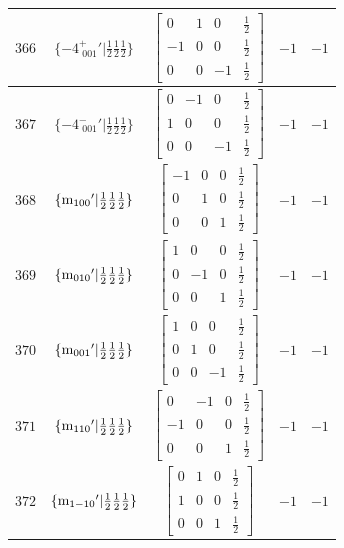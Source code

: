 \documentclass[fleqn,8pt]{jsarticle}
\begin{document}
\begin{longtable}{ccccc}
$ 366 $ & $ \{-4^{+}_{\,\,001}{}'|\frac{1}{2} \frac{1}{2} \frac{1}{2}\} $ & $ \begin{bmatrix} 0 & 1 & 0 & \frac{1}{2} \\ -1 & 0 & 0 & \frac{1}{2} \\ 0 & 0 & -1 & \frac{1}{2} \end{bmatrix} $ & $ -1 $ & $ -1 $ \\ \hline
$ 367 $ & $ \{-4^{-}_{\,\,001}{}'|\frac{1}{2} \frac{1}{2} \frac{1}{2}\} $ & $ \begin{bmatrix} 0 & -1 & 0 & \frac{1}{2} \\ 1 & 0 & 0 & \frac{1}{2} \\ 0 & 0 & -1 & \frac{1}{2} \end{bmatrix} $ & $ -1 $ & $ -1 $ \\ \hline
$ 368 $ & $ \{{\rm m}_{100}{}'|\frac{1}{2} \frac{1}{2} \frac{1}{2}\} $ & $ \begin{bmatrix} -1 & 0 & 0 & \frac{1}{2} \\ 0 & 1 & 0 & \frac{1}{2} \\ 0 & 0 & 1 & \frac{1}{2} \end{bmatrix} $ & $ -1 $ & $ -1 $ \\ \hline
$ 369 $ & $ \{{\rm m}_{010}{}'|\frac{1}{2} \frac{1}{2} \frac{1}{2}\} $ & $ \begin{bmatrix} 1 & 0 & 0 & \frac{1}{2} \\ 0 & -1 & 0 & \frac{1}{2} \\ 0 & 0 & 1 & \frac{1}{2} \end{bmatrix} $ & $ -1 $ & $ -1 $ \\ \hline
$ 370 $ & $ \{{\rm m}_{001}{}'|\frac{1}{2} \frac{1}{2} \frac{1}{2}\} $ & $ \begin{bmatrix} 1 & 0 & 0 & \frac{1}{2} \\ 0 & 1 & 0 & \frac{1}{2} \\ 0 & 0 & -1 & \frac{1}{2} \end{bmatrix} $ & $ -1 $ & $ -1 $ \\ \hline
$ 371 $ & $ \{{\rm m}_{110}{}'|\frac{1}{2} \frac{1}{2} \frac{1}{2}\} $ & $ \begin{bmatrix} 0 & -1 & 0 & \frac{1}{2} \\ -1 & 0 & 0 & \frac{1}{2} \\ 0 & 0 & 1 & \frac{1}{2} \end{bmatrix} $ & $ -1 $ & $ -1 $ \\ \hline
$ 372 $ & $ \{{\rm m}_{1-10}{}'|\frac{1}{2} \frac{1}{2} \frac{1}{2}\} $ & $ \begin{bmatrix} 0 & 1 & 0 & \frac{1}{2} \\ 1 & 0 & 0 & \frac{1}{2} \\ 0 & 0 & 1 & \frac{1}{2} \end{bmatrix} $ & $ -1 $ & $ -1 $ \\ \hline

\end{longtable}
\end{document}
